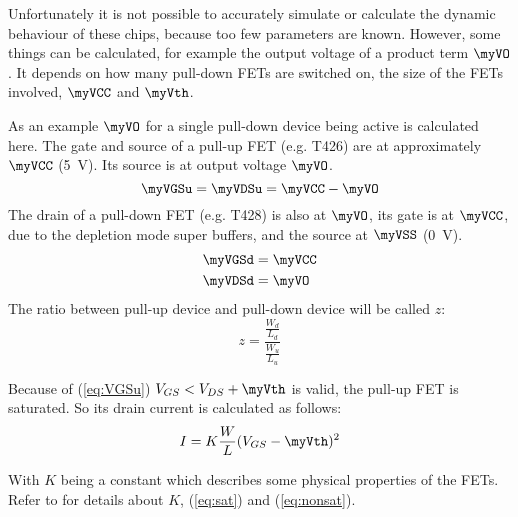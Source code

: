 Unfortunately it is not possible to accurately simulate or calculate the dynamic
behaviour of these chips, because too few parameters are known.
However, some things can be calculated, for example the output
voltage of a product term $\myVO$. It depends on how many pull-down FETs are
switched on, the size of the FETs involved, $\myVCC$ and $\myVth$.

As an example $\myVO$ for a single pull-down device being active is calculated
here. The gate and source of a pull-up FET (e.g. T426) are at approximately
$\myVCC$ (\SI{5}{\volt}). Its source is at output voltage $\myVO$.
\begin{equation}
\label{eq:VGSu}     \myVGSu = \myVDSu = \myVCC - \myVO
\end{equation}
The drain of a pull-down FET (e.g. T428) is also at $\myVO$, its gate is at
$\myVCC$, due to the depletion mode super buffers, and the source at $\myVSS$
(\SI{0}{\volt}).
\begin{align}
\label{eq:VGSd}     \myVGSd &= \myVCC \\
\label{eq:VDSd}     \myVDSd &= \myVO
\end{align}
The ratio between pull-up device and pull-down device will be called $z$:
\begin{equation}
\label{eq:z}        z = \frac {\frac{W_d}{L_d}} {\frac{W_u}{L_u}}
\end{equation}

Because of (\ref{eq:VGSu}) $V_{GS} < V_{DS} + \myVth$ is valid,
the pull-up FET is saturated. So its drain current is calculated as follows:
\begin{equation}
\label{eq:sat}
    I = K \frac{W}{L} (V_{GS} - \myVth)^2
\end{equation}

With $K$ being a constant which describes some physical properties of the
FETs. Refer to \cite{Ray08} for details about $K$, (\ref{eq:sat}) and
(\ref{eq:nonsat}).

